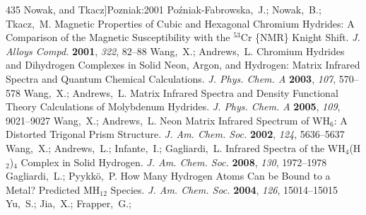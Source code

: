 \documentclass[12pt,letterpaper,oneside]{article}
\begin{document}
\begin{mcitethebibliography}{435}
  Nowak, and Tkacz]{Pozniak:2001}
Po{\'z}niak-Fabrowska,~J.; Nowak,~B.; Tkacz,~M. Magnetic Properties of Cubic
  and Hexagonal Chromium Hydrides: A Comparison of the Magnetic Susceptibility
  with the $^{53}$Cr \{NMR\} Knight Shift. \emph{J. Alloys Compd.}
  \textbf{2001}, \emph{322}, 82--88\relax
\mciteBstWouldAddEndPuncttrue
\mciteSetBstMidEndSepPunct{\mcitedefaultmidpunct}
{\mcitedefaultendpunct}{\mcitedefaultseppunct}\relax
\EndOfBibitem
{}
Wang,~X.; Andrews,~L. Chromium Hydrides and Dihydrogen Complexes in Solid Neon,
  Argon, and Hydrogen: Matrix Infrared Spectra and Quantum Chemical
  Calculations. \emph{J. Phys. Chem. A} \textbf{2003}, \emph{107},
  570--578\relax
\mciteBstWouldAddEndPuncttrue
\mciteSetBstMidEndSepPunct{\mcitedefaultmidpunct}
{\mcitedefaultendpunct}{\mcitedefaultseppunct}\relax
\EndOfBibitem
{}
Wang,~X.; Andrews,~L. Matrix Infrared Spectra and Density Functional Theory
  Calculations of Molybdenum Hydrides. \emph{J. Phys. Chem. A} \textbf{2005},
  \emph{109}, 9021--9027\relax
\mciteBstWouldAddEndPuncttrue
\mciteSetBstMidEndSepPunct{\mcitedefaultmidpunct}
{\mcitedefaultendpunct}{\mcitedefaultseppunct}\relax
\EndOfBibitem
{}
Wang,~X.; Andrews,~L. Neon Matrix Infrared Spectrum of WH$_6$: A Distorted
  Trigonal Prism Structure. \emph{J. Am. Chem. Soc.} \textbf{2002}, \emph{124},
  5636--5637\relax
\mciteBstWouldAddEndPuncttrue
\mciteSetBstMidEndSepPunct{\mcitedefaultmidpunct}
{\mcitedefaultendpunct}{\mcitedefaultseppunct}\relax
\EndOfBibitem
{}
Wang,~X.; Andrews,~L.; Infante,~I.; Gagliardi,~L. Infrared Spectra of the
  WH$_4$(H$_2$)$_4$ Complex in Solid Hydrogen. \emph{J. Am. Chem. Soc.}
  \textbf{2008}, \emph{130}, 1972--1978\relax
\mciteBstWouldAddEndPuncttrue
\mciteSetBstMidEndSepPunct{\mcitedefaultmidpunct}
{\mcitedefaultendpunct}{\mcitedefaultseppunct}\relax
\EndOfBibitem
{}
Gagliardi,~L.; Pyykk{\"o},~P. How Many Hydrogen Atoms Can be Bound to a Metal?
  Predicted MH$_{12}$ Species. \emph{J. Am. Chem. Soc.} \textbf{2004},
  \emph{126}, 15014--15015\relax
\mciteBstWouldAddEndPuncttrue
\mciteSetBstMidEndSepPunct{\mcitedefaultmidpunct}
{\mcitedefaultendpunct}{\mcitedefaultseppunct}\relax
\EndOfBibitem
{}
Yu,~S.; Jia,~X.; Frapper,~G.; 

\end{mcitethebibliography}
\end{document}
